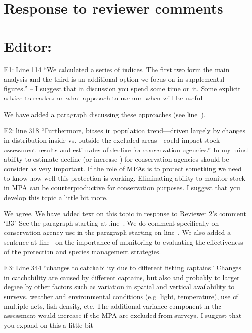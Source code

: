 \documentclass[12pt]{article}
\newcommand{\rev}[1]{{\color{niceblue} #1}}
\newcommand{\lr}[1]{line~\lineref{#1}}
\begin{document}
\clearpage

\section*{Response to reviewer comments}

\setcounter{page}{1}
\nolinenumbers

\setlength{\parskip}{5pt}%
\setlength{\parindent}{0pt}%

\section{Editor:}

\rev{E1: Line 114 “We calculated a series of indices. The first two form the main analysis and the third is an additional option we focus on in supplemental figures.” – I suggest that in discussion you spend some time on it. Some explicit advice to readers on what approach to use and when will be useful.}

We have added a paragraph discussing these approaches (see \lr{E1}).

\rev{E2: line 318 “Furthermore, biases in population trend—driven largely by changes in distribution inside vs. outside the excluded areas—could impact stock assessment results and estimates of decline for conservation agencies.” In my mind ability to estimate decline (or increase ) for conservation agencies should be consider as very important. If the role of MPAs is to protect something we need to know how well this protection is working. Eliminating ability to monitor stock in MPA can be counterproductive for conservation purposes. I suggest that you develop this topic a little bit more.}

We agree. We have added text on this topic in response to Reviewer 2's comment `B3'. See the paragraph starting at \lr{B3}. We do comment specifically on conservation agency use in the paragraph starting on \lr{E2a}. We also added a sentence at \lr{E5} on the importance of monitoring to evaluating the effectiveness of the protection and species management strategies.

\rev{E3: Line 344 “changes to catchability due to different fishing captains” Changes in catchability are caused by different captains, but also and probably to larger degree by other factors such as variation in spatial and vertical availability to surveys, weather and environmental conditions (e.g. light, temperature), use of multiple nets, fish density, etc. The additional variance component in the assessment would increase if the MPA are excluded from surveys. I suggest that you expand on this a little bit.}
\end{document}
